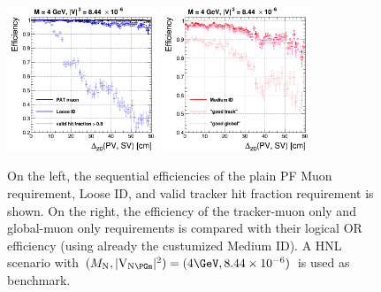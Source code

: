 \begin{figure}[h]
\centering
  \includegraphics[width=0.40\textwidth]{Figures/c6/object/loose_validFraction_M-4_V-0p00290516780927_rho.png}
  \includegraphics[width=0.40\textwidth]{Figures/c6/object/goodTrack_goodGlobal_M-4_V-0p00290516780927_rho.png}
  \caption{On the left, the sequential
efficiencies of the plain PF Muon requirement, Loose ID, and
valid tracker hit fraction requirement is shown. On the right, the efficiency of the tracker-muon only and
    global-muon only requirements is compared with their logical OR
    efficiency (using already the custumized Medium ID). A HNL scenario with
    $(\mhnl,\mixparm)=(4\GeV,8.44\times10^{-6})$ is used as
    benchmark. \dani}
  \label{fig:c2tracking2}
\end{figure}

